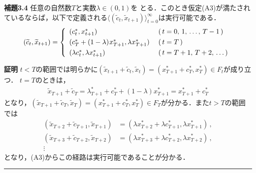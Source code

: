 \documentclass[a4paper,11pt]{jsarticle}
\begin{document}
\vspace{7mm}
\noindent \textbf{補題3.4}\hspace*{.7mm} 任意の自然数$T$と実数$\lambda \in (0,1)$を
とる．このとき仮定(A3)が満たされているならば，以下で定義される$\langle (\widetilde{c}_t,\widetilde{x}_{t+1})\rangle_{t=0}^\infty$は実行可能である．
\begin{align*}
	(\widetilde{c}_t,\widetilde{x}_{t+1})=
        	\left\{
                	\begin{array}{ll}
                        	(c_t^*,x_{t+1}^*)							&\;	(\,t=0,\,1,\,\ldots,\,T-1\,)\vspace{1.2mm}\\
                                (c_T^*+(1-\lambda)\hspace{.2mm}x_{T+1}^*,\lambda x_{T+1}^*)&\;	(\,t=T\,)\vspace{1.2mm}\\
                                (\lambda c_t^*,\lambda x_{t+1}^*)		&\;	(\,t=T+1,\,T+2,\,\ldots\,)
                        \end{array}
                \right.
\end{align*}
\bigskip

\noindent \textbf{証明}\hspace{.7mm} $t<T$の範囲では明らかに$(\widetilde{x}_{t+1}+\widetilde{c}_t,\widetilde{x}_t)=(x_{T+1}^*+c_T^*,x_T^*) \in F_t$が成り立つ．
$t=T$のときは，
\begin{align*}
	\widetilde{x}_{T+1}+\widetilde{c}_{T}
	=\lambda_{T+1}^*+c_T^*+(1-\lambda)x_{T+1}^*
	=x_{T+1}^*+c_T^*
\end{align*}
となり，$(\widetilde{x}_{T+1}+\widetilde{c}_T,\widetilde{x}_T)=(x_{T+1}^*+c_T^*,x_T^*)\in F_T$が分かる．また$t>T$の範囲では
\begin{align*}
	(\widetilde{x}_{T+2}+\widetilde{c}_{T+1},\widetilde{x}_{T+1})&=(\lambda x_{T+2}^*+\lambda c_{T+1}^*,\lambda x_{T+1}^*)\,,\\
		(\widetilde{x}_{T+3}+\widetilde{c}_{T+2},\widetilde{x}_{T+2})&=(\lambda x_{T+3}^*+\lambda c_{T+2}^*,\lambda x_{T+2}^*)\,,\\
\vdots
\end{align*}
となり，(A3)からこの経路は実行可能であることが分かる．\hfill \rule[-2pt]{5pt}{10pt}
\end{document}
